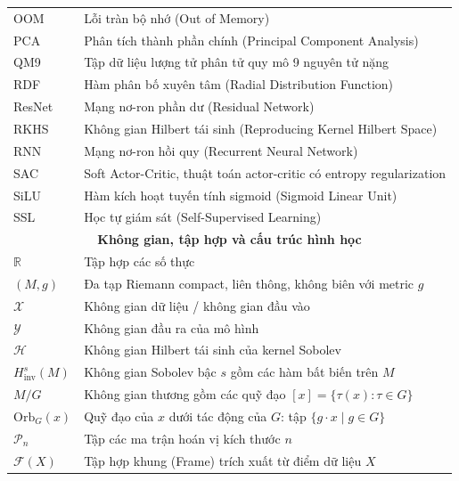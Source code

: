 \documentclass[oneside]{hcmus-report}
\theoremstyle{plain}
\theoremstyle{definition}
\begin{document}
\begin{longtable}{p{} p{}}
OOM & Lỗi tràn bộ nhớ (Out of Memory) \\
PCA & Phân tích thành phần chính (Principal Component Analysis) \\
QM9 & Tập dữ liệu lượng tử phân tử quy mô 9 nguyên tử nặng \\
RDF & Hàm phân bố xuyên tâm (Radial Distribution Function) \\
ResNet & Mạng nơ-ron phần dư (Residual Network) \\
RKHS & Không gian Hilbert tái sinh (Reproducing Kernel Hilbert Space) \\
RNN & Mạng nơ-ron hồi quy (Recurrent Neural Network) \\
SAC & Soft Actor-Critic, thuật toán actor-critic có entropy regularization \\
SiLU & Hàm kích hoạt tuyến tính sigmoid (Sigmoid Linear Unit) \\
SSL & Học tự giám sát (Self-Supervised Learning) \\

\hline


\multicolumn{2}{c}{\textbf{Không gian, tập hợp và cấu trúc hình học}} \\
\hline
$\mathbb{R}$ & Tập hợp các số thực \\
$(M, g)$ & Đa tạp Riemann compact, liên thông, không biên với metric $g$ \\
$\mathcal{X}$ & Không gian dữ liệu / không gian đầu vào \\
$\mathcal{Y}$ & Không gian đầu ra của mô hình \\
$\mathcal{H}$ & Không gian Hilbert tái sinh của kernel Sobolev \\
$H^s_{\mathrm{inv}}(M)$ & Không gian Sobolev bậc $s$ gồm các hàm bất biến trên $M$ \\
$M/G$ & Không gian thương gồm các quỹ đạo $[x] = \{\tau(x) : \tau \in G\}$ \\
$\mathrm{Orb}_G(x)$ & Quỹ đạo của $x$ dưới tác động của $G$: tập $\{g \cdot x \mid g \in G\}$ \\
$\mathcal{P}_n$ & Tập các ma trận hoán vị kích thước $n$ \\
$\mathcal{F}(X)$ & Tập hợp khung (Frame) trích xuất từ điểm dữ liệu $X$ \\

\hline


\end{longtable}
\end{document}
